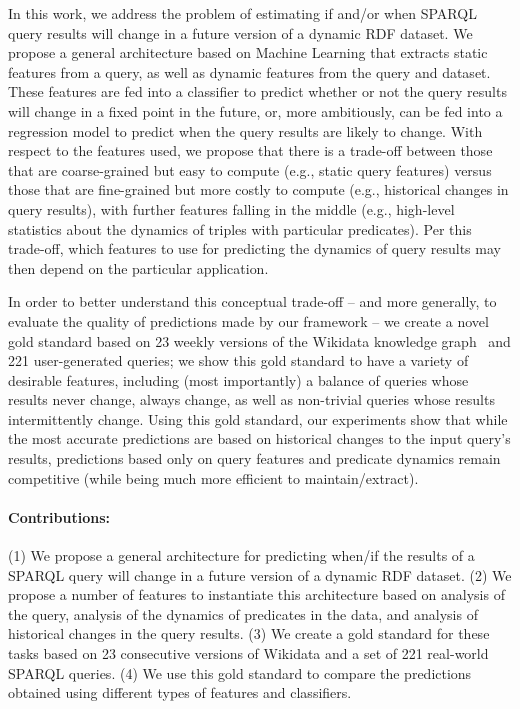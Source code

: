 \documentclass[runningheads]{llncs}
\begin{document}
In this work, we address the problem of estimating if and/or when SPARQL query results will change in a future version of a dynamic RDF dataset. We propose a general architecture based on Machine Learning that extracts static features from a query, as well as dynamic features from the query and dataset. These features are fed into a classifier to predict whether or not the query results will change in a fixed point in the future, or, more ambitiously, can be fed into a regression model to predict when the query results are likely to change. With respect to the features used, we propose that there is a trade-off between those that are coarse-grained but easy to compute (e.g., static query features) versus those that are fine-grained but more costly to compute (e.g., historical changes in query results), with further features falling in the middle (e.g., high-level statistics about the dynamics of triples with particular predicates). Per this trade-off, which features to use for predicting the dynamics of query results may then depend on the particular application.

In order to better understand this conceptual trade-off -- and more generally, to evaluate the quality of predictions made by our framework -- we create a novel gold standard based on 23 weekly versions of the Wikidata knowledge graph~\cite{VrandecicK14} and 221 user-generated queries; we show this gold standard to have a variety of desirable features, including (most importantly) a balance of queries whose results never change, always change, as well as non-trivial queries whose results intermittently change. Using this gold standard, our experiments show that while the most accurate predictions are based on historical changes to the input query's results, predictions based only on query features and predicate dynamics remain competitive (while being much more efficient to maintain/extract).

\paragraph{Contributions:} (1) We propose a general architecture for predicting when/if the results of a SPARQL query will change in a future version of a dynamic RDF dataset. (2) We propose a number of features to instantiate this architecture based on analysis of the query, analysis of the dynamics of predicates in the data, and analysis of historical changes in the query results. (3) We create a gold standard for these tasks based on 23 consecutive versions of Wikidata and a set of 221 real-world SPARQL queries. (4) We use this gold standard to compare the predictions obtained using different types of features and classifiers.
\end{document}
